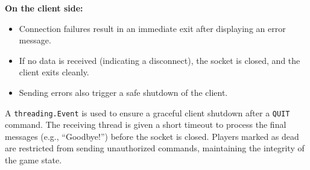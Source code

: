 \documentclass{article}
\begin{document}
\textbf{On the client side:}

\begin{itemize}
    \item Connection failures result in an immediate exit after displaying an error message.
    \item If no data is received (indicating a disconnect), the socket is closed, and the client exits cleanly.
    \item Sending errors also trigger a safe shutdown of the client.
\end{itemize}

A \texttt{threading.Event} is used to ensure a graceful client shutdown after a \texttt{QUIT} command. The receiving thread is given a short timeout to process the final messages (e.g., “Goodbye!”) before the socket is closed. Players marked as dead are restricted from sending unauthorized commands, maintaining the integrity of the game state.
\end{document}
